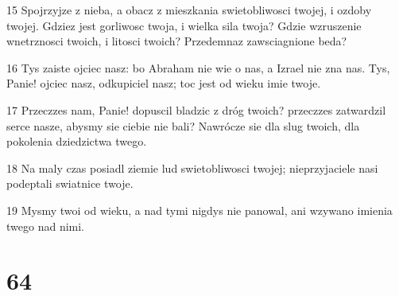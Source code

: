 \par 15 Spojrzyjze z nieba, a obacz z mieszkania swietobliwosci twojej, i ozdoby twojej. Gdziez jest gorliwosc twoja, i wielka sila twoja? Gdzie wzruszenie wnetrznosci twoich, i litosci twoich? Przedemnaz zawsciagnione beda?
\par 16 Tys zaiste ojciec nasz: bo Abraham nie wie o nas, a Izrael nie zna nas. Tys, Panie! ojciec nasz, odkupiciel nasz; toc jest od wieku imie twoje.
\par 17 Przeczzes nam, Panie! dopuscil bladzic z dróg twoich? przeczzes zatwardzil serce nasze, abysmy sie ciebie nie bali? Nawrócze sie dla slug twoich, dla pokolenia dziedzictwa twego.
\par 18 Na maly czas posiadl ziemie lud swietobliwosci twojej; nieprzyjaciele nasi podeptali swiatnice twoje.
\par 19 Mysmy twoi od wieku, a nad tymi nigdys nie panowal, ani wzywano imienia twego nad nimi.

\chapter{64}

